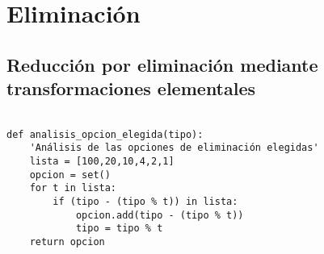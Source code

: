 \documentclass[11pt]{report}
\begin{document}
\section{Eliminación}
\label{sec:orgba22747}
\subsection{Reducción por eliminación mediante transformaciones elementales}
\label{sec:org6b062a8}

\begin{verbatim}

def analisis_opcion_elegida(tipo):
    'Análisis de las opciones de eliminación elegidas'
    lista = [100,20,10,4,2,1]
    opcion = set()
    for t in lista:
        if (tipo - (tipo % t)) in lista:
            opcion.add(tipo - (tipo % t))
            tipo = tipo % t
    return opcion
    
\end{verbatim}
\end{document}
